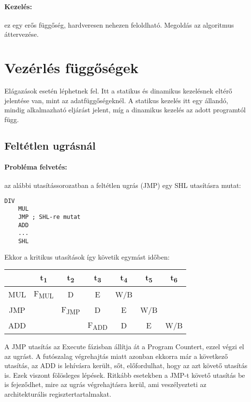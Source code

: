 \paragraph{Kezelés:} ez egy erős függőség, hardveresen nehezen feloldható. Megoldás az algoritmus áttervezése.

\section{Vezérlés függőségek}
Elágazások esetén léphetnek fel. Itt a statikus és dinamikus kezelésnek eltérő jelentése van, mint az adatfüggőségeknél. A statikus kezelés itt egy állandó, mindig alkalmazható eljárást jelent, míg a dinamikus kezelés az adott programtól függ.
\subsection{Feltétlen ugrásnál}
\paragraph{Probléma felvetés:} az alábbi utasítássorozatban a feltétlen ugrás (JMP) egy SHL utasításra mutat:
\begin{lstlisting}[language=Ant]
    DIV
    MUL
    JMP ; SHL-re mutat
    ADD
    ...
    SHL
\end{lstlisting}
Ekkor a kritikus utasítások így követik egymást időben:
\begin{center}
    \begin{tabular}{ c | c | c | c | c | c | c }
            & t\textsubscript{1}   & t\textsubscript{2}   & t\textsubscript{3}   & t\textsubscript{4} & t\textsubscript{5} & t\textsubscript{6} \\
        \hline
        MUL & F\textsubscript{MUL} & D                    & E                    & W/B                &                    &                    \\
        \hline
        JMP &                      & F\textsubscript{JMP} & D                    & E                  & W/B                                     \\
        \hline
        ADD &                      &                      & F\textsubscript{ADD} & D                  & E                  & W/B
    \end{tabular}
\end{center}
A JMP utasítás az Execute fázisban állítja át a Program Countert, ezzel végzi el az ugrást.
A futószalag végrehajtás miatt azonban ekkorra már a következő utasítás, az ADD is lehívásra került, sőt, előfordulhat, hogy az azt követő utasítás is.
Ezek viszont fölösleges lépések. Ritkább esetekben a JMP-t követő utasítás be is fejeződhet, mire az ugrás végrehajtásra kerül, ami veszélyezteti az architekturális regisztertartalmakat.
